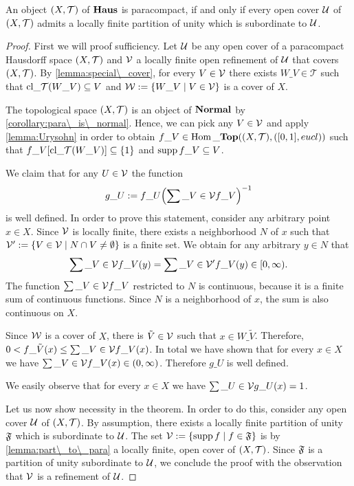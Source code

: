 \begin{theorem}\label{theorem:para\_part}
	An object $\tspace$ of $\Haus$ is paracompact, if and only if every open cover $\cover$ of $\tspace$ admits a locally finite partition of unity which is subordinate to $\cover$.  
\end{theorem}
\begin{proof}
	First we will proof sufficiency. Let $\cover$ be any open cover of a paracompact Hausdorff space $\tspace$ and $\cover[V]$ a locally finite open refinement of $\cover$ that covers $\tspace$. By \ref{lemma:special\_cover}, for every $V \in \cover[V]$ there exists $W\_V \in \mathcal{T}$ such that $\cl{W\_V} \subseteq V$ and $\cover[W] := \Bbraces{W\_V \mid V \in \cover[V]}$ is a cover of $X$. 
	
	The topological space $\tspace$ is an object of $\Normal$ by \ref{corollary:para\_is\_normal}. Hence, we can pick any $V \in \cover[V]$ and apply \ref{lemma:Urysohn} in order to obtain $f\_V \in \Hom\_\Top\pbraces{\tspace, \pbraces{[0,1], \eucl}}$ such that $f\_V\bbraces{\cl{W\_V}} \subseteq \{1\}$ and $\supp f\_V \subseteq V$.
	
	We claim that for any $U \in \cover[V]$ the function
	\begin{align*}
		g\_U := f\_U \pbraces{\sum\_{V \in \cover[V]} f\_V}^{-1}
	\end{align*}
	is well defined. In order to prove this statement, consider any arbitrary point $x \in X$.  Since $\cover[V]$ is locally finite, there exists a neighborhood $N$ of $x$ such that $\cover[V]^\prime := \Bbraces{V \in \cover[V] \mid N \cap V \neq \emptyset}$ is a finite set.  We obtain for any arbitrary $y \in N$ that
	\begin{align*}
		\sum\_{V \in \cover[V]} f\_V(y) = \sum\_{V \in \cover[V]^\prime} f\_V(y) \in [0, \infty).
	\end{align*}
	The function $\sum\_{V \in \cover[V]} f\_V$ restricted to $N$ is continuous, because it is a finite sum of continuous functions. Since $N$ is a neighborhood of $x$, the sum is also continuous on $X$.
	
	Since $\cover[W]$ is a cover of $X$, there is $\tilde{V} \in \cover[V]$ such that $x \in W\_{\tilde{V}}$. Therefore, $0 < f\_{\tilde{V}}(x) \leq \sum\_{V \in \cover[V]} f\_V(x)$. In total we have shown that for every $x \in X$ we have $\sum\_{V \in \cover[V]} f\_V(x) \in (0, \infty)$. Therefore $g\_U$ is well defined.
	
	We easily observe that for every $x \in X$ we have $\sum\_{U \in \cover[V]} g\_U(x) = 1$. 
	
	Let us now show necessity in the theorem. In order to do this, consider any open cover $\cover$ of $\tspace$. By assumption, there exists a locally finite partition of unity $\partition$ which is subordinate to $\cover$. The set $\cover[V] := \Bbraces{\supp f \mid f \in \partition}$ is by \ref{lemma:part\_to\_para} a locally finite, open cover of $\tspace$. Since $\partition$ is a partition of unity subordinate to $\cover$, we conclude the proof with the observation that $\cover[V]$ is a refinement of $\cover$. 
\end{proof}
